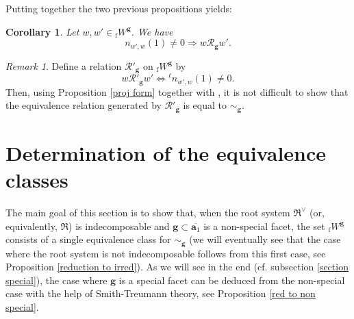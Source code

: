 \documentclass[11pt]{amsart}
\theoremstyle{plain}
\newtheorem{coro}[thm]{Corollary}
\theoremstyle{remark}
\newtheorem{rem}[thm]{Remark}
\numberwithin{equation}{section}
\begin{document}
	Putting together the two previous propositions yields:
	\begin{coro}\label{anti spherical implies R}
		Let $w,w'\in {_\mathrm{f}W}^{\mathbf{g}}$. We have $$n_{w',w}(1)\neq0\Rightarrow w\mathscr{R}_{\mathbf{g}}w'.$$
	\end{coro}
	\begin{rem}
		Define a relation $\mathscr{R}'_\mathbf{g}$ on ${_\mathrm{f}W}^{\mathbf{g}}$ by 
		$$w \mathscr{R}'_\mathbf{g}w'\Longleftrightarrow {^\ell n}_{w',w}(1)\neq0.$$
		Then, using Proposition \ref{proj form} together with \cite[Proposition 2.6]{2014}, it is not difficult to show that the equivalence relation generated by $\mathscr{R}'_\mathbf{g}$ is equal to $\sim_\mathbf{g}$.
	\end{rem}\section{Determination of the equivalence classes}\label{Determination of the blocks}
	The main goal of this section is to show that, when the root system $\mathfrak{R}^\vee$ (or, equivalently, $\mathfrak{R}$) is indecomposable and $\mathbf{g}\subset\overline{\mathbf{a}_1}$ is a non-special facet, the set ${_\mathrm{f}W}^\mathbf{g}$ consists of a single equivalence class for $\sim_\mathbf{g}$ (we will eventually see that the case where the root system is not indecomposable follows from this first case, see Proposition \ref{reduction to irred}). As we will see in the end (cf. subsection \ref{section special}), the case where $\mathbf{g}$ is a special facet can be deduced from the non-special case with the help of Smith-Treumann theory, see Proposition \ref{red to non special}.
\end{document}
